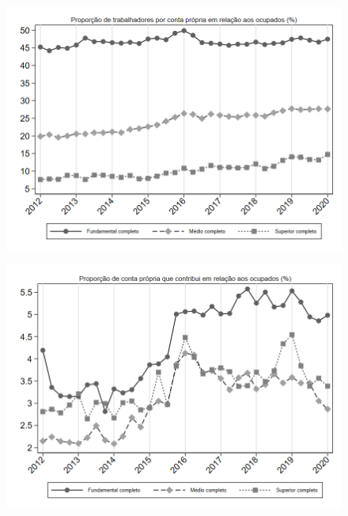 \begin{frame}[label=_composicao_demografica_educacao_prop_cpropria]{}
\textit{\hyperlink{_composicao_demografica_educacao}{}}
\begin{figure}
  \centering
  \includegraphics[width=1.0\linewidth]{../../analysis/output/composicao_demografica/educacao/_composicao_demografica_educacao_prop_cpropria.png}
  \caption{}
  \label{fig:_composicao_demografica_educacao_prop_cpropria}
\end{figure}
\end{frame}

\begin{frame}[label=_composicao_demografica_educacao_prop_cpropriaC]{}
\textit{\hyperlink{_composicao_demografica_educacao}{}}
\begin{figure}
  \centering
  \includegraphics[width=1.0\linewidth]{../../analysis/output/composicao_demografica/educacao/_composicao_demografica_educacao_prop_cpropriaC.png}
  \caption{}
  \label{fig:_composicao_demografica_educacao_prop_cpropriaC}
\end{figure}
\end{frame}

